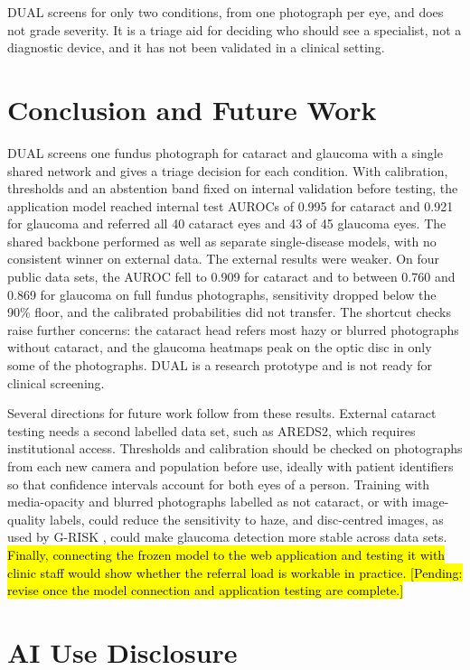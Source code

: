 \documentclass[conference,a4paper]{IEEEtran}
\newcommand{\pendingedit}[1]{\hl{#1}}
\begin{document}
DUAL screens for only two conditions, from one photograph per eye, and does not grade severity. It
is a triage aid for deciding who should see a specialist, not a diagnostic device, and it has not
been validated in a clinical setting.

\section{Conclusion and Future Work}

DUAL screens one fundus photograph for cataract and glaucoma with a single shared network and gives
a triage decision for each condition. With calibration, thresholds and an abstention band fixed on
internal validation before testing, the application model reached internal test AUROCs of 0.995 for
cataract and 0.921 for glaucoma and referred all 40 cataract eyes and 43 of 45 glaucoma eyes. The
shared backbone performed as well as separate single-disease models, with no consistent winner on
external data. The external results were weaker. On four public data sets, the AUROC fell to 0.909
for cataract and to between 0.760 and 0.869 for glaucoma on full fundus photographs, sensitivity
dropped below the 90\% floor, and the calibrated probabilities did not transfer. The shortcut checks
raise further concerns: the cataract head refers most hazy or blurred photographs without cataract,
and the glaucoma heatmaps peak on the optic disc in only some of the photographs. DUAL is a research
prototype and is not ready for clinical screening.

Several directions for future work follow from these results. External cataract testing needs a
second labelled data set, such as AREDS2, which requires institutional access. Thresholds and
calibration should be checked on photographs from each new camera and population before use, ideally
with patient identifiers so that confidence intervals account for both eyes of a person. Training
with media-opacity and blurred photographs labelled as not cataract, or with image-quality labels,
could reduce the sensitivity to haze, and disc-centred images, as used by G-RISK \cite{ref9}, could
make glaucoma detection more stable across data sets. \pendingedit{Finally, connecting the frozen model to the
web application and testing it with clinic staff would show whether the referral load is workable in
practice. [Pending: revise once the model connection and application testing are complete.]}

\section*{AI Use Disclosure}
\end{document}
